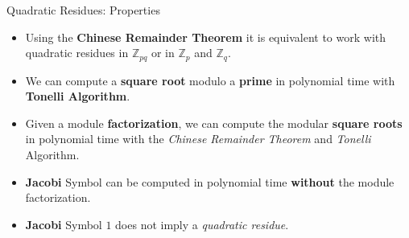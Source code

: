 \documentclass{beamer}
\begin{document}


\begin{frame}{Quadratic Residues: Properties}
\begin{itemize}
	\item Using the \textbf{Chinese Remainder Theorem} it is equivalent to work with quadratic residues in ${\mathbb Z}_{pq}$ or in ${\mathbb Z}_p$ and ${\mathbb Z}_q$.
	\item We can compute a \textbf{square root} modulo a \textbf{prime} in polynomial time with \textbf{Tonelli Algorithm}.
	\item Given a module \textbf{factorization}, we can compute the modular \textbf{square roots} in polynomial time with the \textit{Chinese Remainder Theorem} and \textit{Tonelli} Algorithm.
	\item \textbf{Jacobi} Symbol can be computed in polynomial time \textbf{without} the module factorization.
	\item \textbf{Jacobi} Symbol $1$ does not imply a \textit{quadratic residue}.
\end{itemize}
\end{frame}

\end{document}
